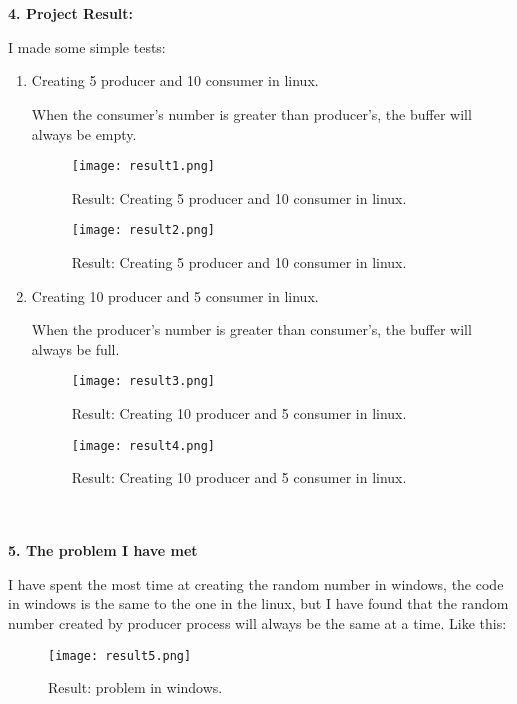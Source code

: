 \documentclass[12pt,a4paper]{article}
\begin{document}
~\\
~\\
\begin{large}
\textbf{4. Project Result:}
\end{large}
I made some simple tests:
\begin{enumerate}

\item Creating 5 producer and 10 consumer in linux.

When the consumer's number is greater than producer's, the buffer will always be empty.
\begin{figure}[H]
  \centering
  \texttt{[image: result1.png]}
  \caption{Result: Creating 5 producer and 10 consumer in linux.}%
\end{figure}
\begin{figure}[H]
  \centering
  \texttt{[image: result2.png]}
  \caption{Result: Creating 5 producer and 10 consumer in linux.}%
\end{figure}


\item  Creating 10 producer and 5 consumer in linux.

When the producer's number is greater than consumer's, the buffer will always be full.
\begin{figure}[H]
  \centering
  \texttt{[image: result3.png]}
  \caption{Result: Creating 10 producer and 5 consumer in linux.}%
\end{figure}
\begin{figure}[H]
  \centering
  \texttt{[image: result4.png]}
  \caption{Result: Creating 10 producer and 5 consumer in linux.}%
\end{figure}

\end{enumerate}

\begin{large}
~\\
~\\
\textbf{5. The problem I have met}
\end{large}

I have spent the most time at creating the random number in windows, the code in windows is the same to the one in the linux, but I have found that the random number created by producer process will always be the same at a time. Like this:

\begin{figure}[H]
  \centering
  \texttt{[image: result5.png]}
  \caption{Result: problem in windows.}%
\end{figure}
\end{document}
